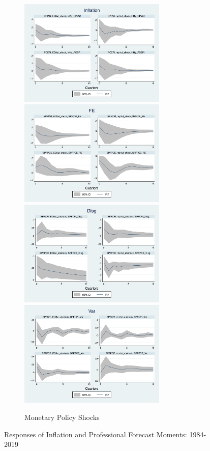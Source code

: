\documentclass[12pt]{article}
\begin{document}
\begin{figure}[p]
		\hfill
		\hspace{1em}
		\begin{subfigure}[b]{0.5\textwidth}
			\caption{Monetary Policy Shocks}
			\includegraphics[width=7cm]{figures/Inf_ashocks.png} 
			\smallskip
			\includegraphics[width=7cm]{figures/SPFFE_ashocks.png} 
			\smallskip
			\includegraphics[width=7cm]{figures/SPFDisg_ab_ashocks.png} 
			\smallskip
			\includegraphics[width=7cm]{figures/SPFVar_ab_ashocks.png} 
		\end{subfigure} 
		\caption{Responses of Inflation and Professional Forecast Moments: 1984-2019}
		\label{ReplicateCoibionwholeperiod}
	\end{figure}
	
\end{document}
